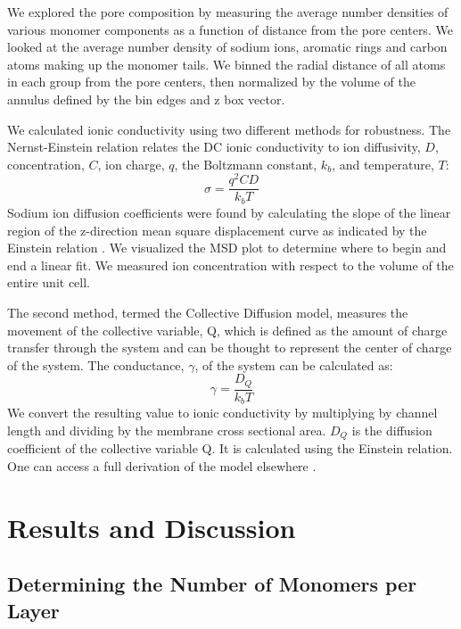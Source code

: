 \documentclass{article}
\begin{document}
  We explored the pore composition by measuring the average number densities of
  various monomer components as a function of distance from the pore centers.  We
  looked at the average number density of sodium ions, aromatic rings and carbon
  atoms making up the monomer tails. We binned the radial distance of all atoms
  in each group from the pore centers, then normalized by the volume of the
  annulus defined by the bin edges and z box vector.

  We calculated ionic conductivity using two different methods for robustness.
  The Nernst-Einstein relation relates the DC ionic conductivity to ion
  diffusivity, $D$, concentration, $C$, ion charge, $q$, the Boltzmann constant,
  $k_b$, and temperature, $T$: $$\sigma = \dfrac{q^2CD}{k_b T}$$ 
  Sodium ion diffusion coefficients were found by calculating the slope
  of the linear region of the z-direction mean square displacement curve as
  indicated by the Einstein relation \cite{einstein_investigations_1956}. We
  visualized the MSD plot to determine where to begin and end a linear fit. We
  measured ion concentration with respect to the volume of the entire unit cell. 

  The second method, termed the Collective Diffusion model, measures the
  movement of the collective variable, Q, which is defined as the amount of
  charge transfer through the system and can be thought to represent the center
  of charge of the system. The conductance, $\gamma$, of the system can be
  calculated as: $$ \gamma = \dfrac{D_Q}{k_b T} $$ We convert the resulting value
  to ionic conductivity by multiplying by channel length and dividing by the
  membrane cross sectional area. $D_Q$ is the diffusion coefficient of the
  collective variable Q. It is calculated using the Einstein relation. One can
  access a full derivation of the model elsewhere \cite{liu_collective_2013}.

  \section{Results and Discussion}
  
  \subsection{Determining the Number of Monomers per Layer}
\end{document}
